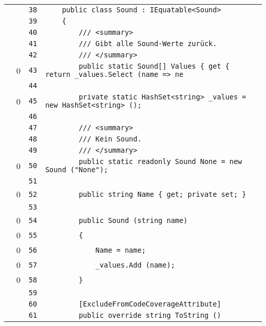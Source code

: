 \documentclass[a4paper,10pt]{article}
\begin{document}
\begin{longtable}[l]{lrrl}
\cellcolor{gray} &  & \verb~38~ & \verb~    public class Sound : IEquatable<Sound>~\\
\cellcolor{gray} &  & \verb~39~ & \verb~    {~\\
\cellcolor{gray} &  & \verb~40~ & \verb~        /// <summary>~\\
\cellcolor{gray} &  & \verb~41~ & \verb~        /// Gibt alle Sound-Werte zurück.~\\
\cellcolor{gray} &  & \verb~42~ & \verb~        /// </summary>~\\
\cellcolor{red} & 0 & \verb~43~ & \verb~        public static Sound[] Values { get { return _values.Select (name => ne~\\
\cellcolor{gray} &  & \verb~44~ & \verb~~\\
\cellcolor{red} & 0 & \verb~45~ & \verb~        private static HashSet<string> _values = new HashSet<string> ();~\\
\cellcolor{gray} &  & \verb~46~ & \verb~~\\
\cellcolor{gray} &  & \verb~47~ & \verb~        /// <summary>~\\
\cellcolor{gray} &  & \verb~48~ & \verb~        /// Kein Sound.~\\
\cellcolor{gray} &  & \verb~49~ & \verb~        /// </summary>~\\
\cellcolor{red} & 0 & \verb~50~ & \verb~        public static readonly Sound None = new Sound ("None");~\\
\cellcolor{gray} &  & \verb~51~ & \verb~~\\
\cellcolor{red} & 0 & \verb~52~ & \verb~        public string Name { get; private set; }~\\
\cellcolor{gray} &  & \verb~53~ & \verb~~\\
\cellcolor{red} & 0 & \verb~54~ & \verb~        public Sound (string name)~\\
\cellcolor{red} & 0 & \verb~55~ & \verb~        {~\\
\cellcolor{red} & 0 & \verb~56~ & \verb~            Name = name;~\\
\cellcolor{red} & 0 & \verb~57~ & \verb~            _values.Add (name);~\\
\cellcolor{red} & 0 & \verb~58~ & \verb~        }~\\
\cellcolor{gray} &  & \verb~59~ & \verb~~\\
\cellcolor{gray} &  & \verb~60~ & \verb~        [ExcludeFromCodeCoverageAttribute]~\\
\cellcolor{gray} &  & \verb~61~ & \verb~        public override string ToString ()~\\

\end{longtable}
\end{document}
